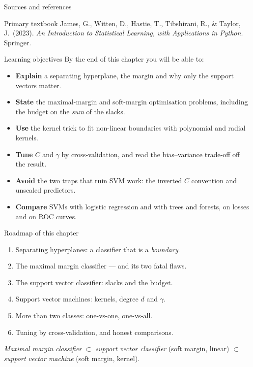 \documentclass[aspectratio=169,11pt]{beamer}
\begin{document}
\begin{frame}{Sources and references}
  \begin{block}{Primary textbook}
    James, G., Witten, D., Hastie, T., Tibshirani, R., \& Taylor, J.\ (2023).
    \emph{An Introduction to Statistical Learning, with Applications in
    Python.} Springer.
  \end{block}
\end{frame}

\begin{frame}{Learning objectives}
  \footnotesize
  By the end of this chapter you will be able to:
  \begin{itemize}
    \item \textbf{Explain} a separating hyperplane, the margin and why only the
          support vectors matter.
    \item \textbf{State} the maximal-margin and soft-margin optimisation
          problems, including the budget on the \emph{sum} of the slacks.
    \item \textbf{Use} the kernel trick to fit non-linear boundaries with
          polynomial and radial kernels.
    \item \textbf{Tune} $C$ and $\gamma$ by cross-validation, and read the
          bias--variance trade-off off the result.
    \item \textbf{Avoid} the two traps that ruin SVM work: the inverted $C$
          convention and unscaled predictors.
    \item \textbf{Compare} SVMs with logistic regression and with trees and
          forests, on losses and on ROC curves.
  \end{itemize}
\end{frame}

\begin{frame}{Roadmap of this chapter}
  \begin{takeaway}
    \begin{enumerate}
      \item Separating hyperplanes: a classifier that is a \emph{boundary}.
      \item The maximal margin classifier --- and its two fatal flaws.
      \item The support vector classifier: slacks and the budget.
      \item Support vector machines: kernels, degree $d$ and $\gamma$.
      \item More than two classes: one-vs-one, one-vs-all.
      \item Tuning by cross-validation, and honest comparisons.
    \end{enumerate}
  \end{takeaway}
  \begin{takeaway}
    \emph{Maximal margin classifier} $\subset$ \emph{support vector
    classifier} (soft margin, linear) $\subset$ \emph{support vector machine}
    (soft margin, kernel).
  \end{takeaway}
\end{frame}
\end{document}
